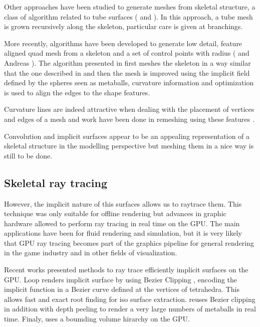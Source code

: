 \documentclass[11pt]{article}
\numberwithin{figure}{section}
\begin{document}
Other approaches have been studied to generate meshes from skeletal structure, a class of algorithm related to tube surfaces (\cite{1309194} and \cite{skjermo}). In this approach, a tube mesh is grown recursively along the skeleton, particular care is given at branchings.

More recently, algorithms have been developed to generate low detail, feature aligned quad mesh from a skeleton and a set of control points with radius (\cite{CGF:CGF1805} and Andreas ). The algorithm presented in \cite{CGF:CGF1805} first meshes the skeleton in a way similar that the one described in \cite{skjermo} and then the mesh is improved using the implicit field defined by the spheres seen as metaballs, curvature information and optimization is used to align the edges to the shape features.

Curvature lines are indeed attractive when dealing with the placement of vertices and edges of a mesh and work have been done in remeshing using these features \cite{alliez03anisotropic}. 

Convolution and implicit surfaces appear to be an appealing representation of a skeletal structure in the modelling perspective but meshing them in a nice way is still to be done. 
\subsection{Skeletal ray tracing}
However, the implicit nature of this surfaces allows us to raytrace them. This technique was only suitable for offline rendering but advances in graphic hardware allowed to perform ray tracing in real time on the GPU. 
The main applications have been for fluid rendering and simulation, but it is very likely that GPU ray tracing becomes part of the graphics pipeline for general rendering in the game industry and in other fields of visualization.

Recent works presented methods to ray trace efficiently implicit surfaces on the GPU. Loop renders implicit surface by using Bezier Clipping \cite{Loop:2006:RGR:1179352.1141939}, encoding the implicit function in a Bezier curve defined at the vertices of tetrahedra. This allows fast and exact root finding for iso surface extraction.  \cite{Fukuyama94amethod} reuses Bezier clipping in addition with depth peeling to render a very large numbers of metaballs in real time. Finaly, \cite{Gourmel-2010-FBVH} uses a boumding volume hirarchy on the GPU.


\end{document}
